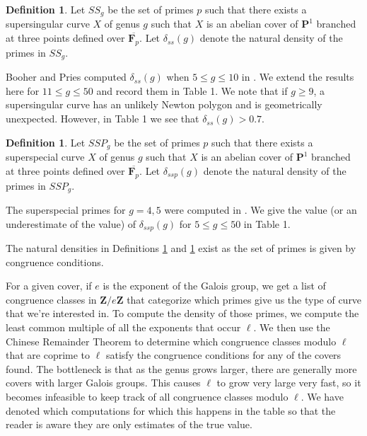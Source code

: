 \documentclass{article}
\theoremstyle{remark}
\theoremstyle{definition}
\newtheorem{definition}[theorem]{Definition}
\begin{document}
\begin{definition}
    \label{ssg}
    Let $SS_g$ be the set of primes $p$ such that there exists a supersingular curve $X$ of genus $g$ such that $X$ is an abelian cover of $\mathbf{P}^1$ branched at three points defined over $\overline{\mathbf{F}_p}$. Let $\delta_{ss}(g)$ denote the natural density of the primes in $SS_g$.
\end{definition}

\par Booher and Pries computed $\delta_{ss}(g)$ when $5 \leq g \leq 10$ in \cite[Corollary 1.1]{booher_supersingular_2025}. We extend the results here for $11 \leq g \leq 50$ and record them in Table 1. We note that if $g \geq 9$, a supersingular curve has an unlikely Newton polygon and is geometrically unexpected. However, in Table 1 we see that $\delta_{ss}(g) > 0.7$.


\begin{definition}
    \label{sspg}
    Let $SSP_g$ be the set of primes $p$ such that there exists a superspecial curve $X$ of genus $g$ such that $X$ is an abelian cover of $\mathbf{P}^1$ branched at three points defined over $\overline{\mathbf{F}_p}$. Let $\delta_{ssp}(g)$ denote the natural density of the primes in $SSP_g$.
\end{definition}

\par The superspecial primes for $g = 4,5$ were computed in \cite{ekedahl_supersingular_1987}. We give the value (or an underestimate of the value) of $\delta_{ssp}(g)$ for $5 \leq g \leq 50$ in Table 1.

\par The natural densities in Definitions \ref{ssg} and \ref{sspg} exist as the set of primes is given by congruence conditions.

\par For a given cover, if $e$ is the exponent of the Galois group, we get a list of congruence classes in $\mathbf{Z}/e\mathbf{Z}$ that categorize which primes give us the type of curve that we're interested in. To compute the density of those primes, we compute the least common multiple of all the exponents that occur $\ell$. We then use the Chinese Remainder Theorem to determine which congruence classes modulo $\ell$ that are coprime to $\ell$ satisfy the congruence conditions for any of the covers found. The bottleneck is that as the genus grows larger, there are generally more covers with larger Galois groups. This causes $\ell$ to grow very large very fast, so it becomes infeasible to keep track of all congruence classes modulo $\ell$. We have denoted which computations for which this happens in the table so that the reader is aware they are only estimates of the true value. 
\end{document}
